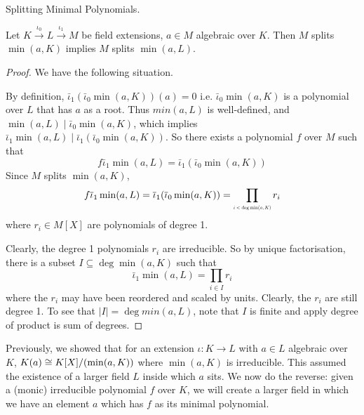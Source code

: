 \documentclass[../book.tex]{subfiles}
\begin{document}
\begin{lem} Splitting Minimal Polynomials.
    
    Let $K \overset{\iota_0}{\to} L \overset{\iota_1}{\to} M$ be field extensions,
    $a \in M$ algebraic over $K$. 
    Then $M$ splits $\min(a,K)$ implies $M$ splits $\min(a,L)$.
\end{lem}
\begin{proof}
    We have the following situation. 
    \begin{figure} [H]
        \centering
    \end{figure}
    By definition, $\bar\iota_1 (\bar\iota_0 \min(a,K))(a)=0$ i.e. 
    $\bar\iota_0 \min(a,K)$ is a polynomial over $L$ that has $a$ as a root. 
    Thus $min(a,L)$ is well-defined,
    and $\min(a,L) \mid \bar\iota_0 \min(a, K)$,
    which implies $\bar\iota_1 \min(a,L) \mid \bar\iota_1 (\bar\iota_0 \min(a,K))$.
    So there exists a polynomial $f$ over $M$ such that \[
        f \bar\iota_1 \min(a,L) = \bar\iota_1(\bar\iota_0 \min(a,K))
    \]
    Since $M$ splits $\min(a,K)$, \[
        f \bar\iota_1 \min(a,L) =
        \bar\iota_1(\bar\iota_0 \min(a,K)) = \prod_{\tiny{i < \deg\min(a,K)}} r_i
    \]
    where $r_i \in M[X]$ are polynomials of degree 1. 
    
    Clearly, the degree 1 polynomials $r_i$ are irreducible. 
    So by unique factorisation, there is a subset $I \subseteq \deg\min(a,K)$
    such that \[
        \bar\iota_1 \min(a,L) = \prod_{i \in I} r_i
    \]
    where the $r_i$ may have been reordered and scaled by units.
    Clearly, the $r_i$ are still degree 1. 
    To see that $|I| = \deg min(a,L)$, note that $I$ is finite and apply
    degree of product is sum of degrees. 
\end{proof}
\begin{rmk}
    Previously, we showed that for an extension $\iota : K \to L$ with 
    $a \in L$ algebraic over $K$, 
    $K(a) \cong K[X]/(\min(a,K))$ where $\min(a,K)$ is irreducible.
    This assumed the existence of a larger field $L$ inside which $a$ sits. 
    We now do the reverse: 
    given a (monic) irreducible polynomial $f$ over $K$, 
    we will create a larger field in which 
    we have an element $a$ which has $f$ as its minimal polynomial. 
\end{rmk}
\end{document}
